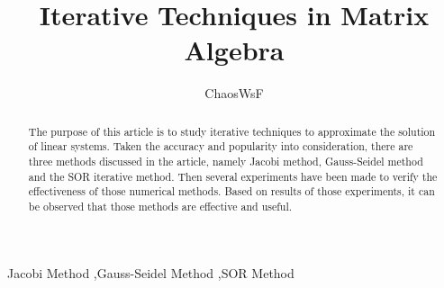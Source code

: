 \documentclass[preprint,12pt]{elsarticle}
\begin{document}
\begin{frontmatter}


\title{Iterative Techniques in Matrix Algebra}




\author{ChaosWsF}

\address{No.*, X University}

\begin{abstract}
The purpose of this article is to study iterative techniques to approximate the solution of linear systems. Taken the accuracy and popularity into consideration, there are three methods discussed in the article, namely Jacobi method, Gauss-Seidel method and the SOR iterative method. Then several experiments have been made to verify the effectiveness of those numerical methods. Based on results of those experiments, it can be observed that those methods are effective and useful.
\end{abstract}

\begin{keyword}
Jacobi Method \sep Gauss-Seidel Method \sep SOR Method


\end{keyword}

\end{frontmatter}

\end{document}
